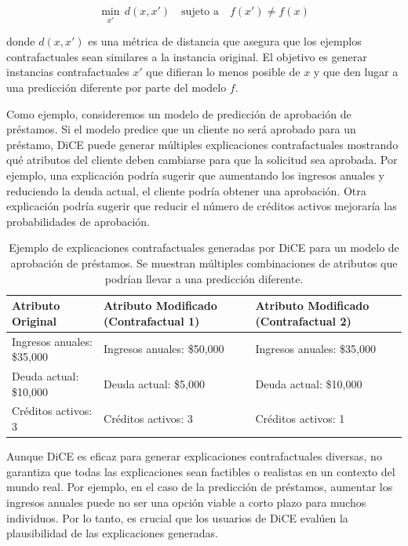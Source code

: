 \[
\min_{x'} \, d(x, x') \quad \text{sujeto a} \quad f(x') \neq f(x)
\]

donde $d(x, x')$ es una métrica de distancia que asegura que los ejemplos contrafactuales sean similares a la instancia original. El objetivo es generar instancias contrafactuales $x'$ que difieran lo menos posible de $x$ y que den lugar a una predicción diferente por parte del modelo $f$.

Como ejemplo, consideremos un modelo de predicción de aprobación de préstamos. Si el modelo predice que un cliente no será aprobado para un préstamo, DiCE puede generar múltiples explicaciones contrafactuales mostrando qué atributos del cliente deben cambiarse para que la solicitud sea aprobada. Por ejemplo, una explicación podría sugerir que aumentando los ingresos anuales y reduciendo la deuda actual, el cliente podría obtener una aprobación. Otra explicación podría sugerir que reducir el número de créditos activos mejoraría las probabilidades de aprobación.

\begin{table}[H]
    \centering
    \scriptsize
    \renewcommand{\arraystretch}{1.5}
    \begin{tabular}{p{4cm} p{4cm} p{4cm}}
        \toprule
        \textbf{Atributo Original} & \textbf{Atributo Modificado (Contrafactual 1)} & \textbf{Atributo Modificado (Contrafactual 2)} \\
        \midrule
        Ingresos anuales: \$35,000 & Ingresos anuales: \$50,000 & Ingresos anuales: \$35,000 \\
        Deuda actual: \$10,000 & Deuda actual: \$5,000 & Deuda actual: \$10,000 \\
        Créditos activos: 3 & Créditos activos: 3 & Créditos activos: 1 \\
        \bottomrule
    \end{tabular}
    \caption{Ejemplo de explicaciones contrafactuales generadas por DiCE para un modelo de aprobación de préstamos. Se muestran múltiples combinaciones de atributos que podrían llevar a una predicción diferente.}
    \label{tab:dice-example}
\end{table}

Aunque DiCE es eficaz para generar explicaciones contrafactuales diversas, no garantiza que todas las explicaciones sean factibles o realistas en un contexto del mundo real. Por ejemplo, en el caso de la predicción de préstamos, aumentar los ingresos anuales puede no ser una opción viable a corto plazo para muchos individuos. Por lo tanto, es crucial que los usuarios de DiCE evalúen la plausibilidad de las explicaciones generadas.

